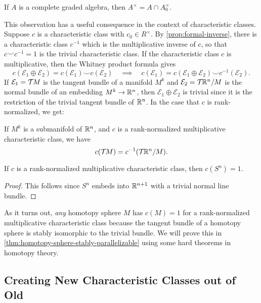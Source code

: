 \begin{proposition}\label{prop:formal-inverse}
	If $A$ is a complete graded algebra, then $A^\times = A \cap A_0^\times$.
\end{proposition}

This observation has a useful consequence in the context of characteristic classes. Suppose $c$ is a characteristic class with $c_0\in R^\times$. By \cref{prop:formal-inverse}, there is a characteristic class $c^{-1}$ which is the multiplicative inverse of $c$, so that $c\smile c^{-1}=1$ is the trivial characteristic class. If the characteristic class $c$ is multiplicative, then the Whitney product formula gives
\[
	c(\mathcal{E}_1\oplus\mathcal{E}_2)	 = c(\mathcal{E}_1)\smile c(\mathcal{E}_2)
	\quad\implies\quad
	c(\mathcal{E}_1) = c(\mathcal{E}_1\oplus \mathcal{E}_2) \smile c^{-1}(\mathcal{E}_2).
\]
If $\mathcal{E}_1={\mathcal{T}\hspace{-0.1em}} M$ is the tangent bundle of a manifold $M^k$ and $\mathcal{E}_2={\mathcal{T}\hspace{-0.1em}}\mathbb{R}^{n}/M$ is the normal bundle of an embedding $M^k\to \mathbb{R}^{n}$, then $\mathcal{E}_1\oplus \mathcal{E}_2$ is trivial since it is the restriction of the trivial tangent bundle of $\mathbb{R}^n$. In the case that $c$ is rank-normalized, we get:
\begin{theorem}\label{thm:whitney-duality}
	If $M^k$ is a submanifold of $\mathbb{R}^n$, and $c$ is a rank-normalized multiplicative characteristic class, we have
	\[
		c({\mathcal{T}\hspace{-0.1em}} M) = c^{-1}({\mathcal{T}\hspace{-0.1em}} \mathbb{R}^n/M).
	\]
\end{theorem}

\begin{corollary}
	If $c$ is a rank-normalized multiplicative characteristic class, then $c(S^n)=1$.
\end{corollary}
\begin{proof}
	This follows since $S^n$ embeds into $\mathbb{R}^{n+1}$ with a trivial normal line bundle.
\end{proof}

\begin{remark}
	As it turns out, \emph{any} homotopy sphere $M$ has $c(M)=1$ for a rank-normalized multiplicative characteristic class because the tangent bundle of a homotopy sphere is stably isomorphic to the trivial bundle. We will prove this in \cref{thm:homotopy-sphere-stably-parallelizable} using some hard theorems in homotopy theory.
\end{remark}

\subsection{Creating New Characteristic Classes out of Old}

